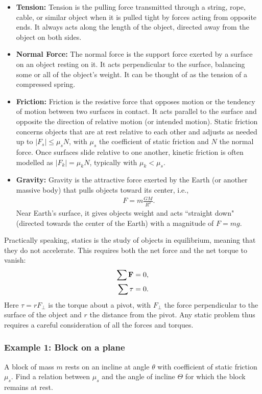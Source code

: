 \documentclass[12pt]{article}
\newcommand{\be}{\begin{eqnarray}}
\newcommand{\ee}{\end{eqnarray}}
\begin{document}
\begin{itemize}
\item {\bf Tension: }Tension is the pulling force transmitted through a string, rope, cable, or similar object when it is pulled tight by forces acting from opposite ends. It always acts along the length of the object, directed away from the object on both sides. 

\item {\bf Normal Force:} The normal force is the support force exerted by a surface on an object resting on it. It acts perpendicular to the surface, balancing some or all of the object's weight. It can be thought of as the tension of a compressed spring.  

\item {\bf Friction:} Friction is the resistive force that opposes motion or the tendency of motion between two surfaces in contact. It acts parallel to the surface and opposite the direction of relative motion (or intended motion). Static friction concerns objects that are at rest relative to each other and adjusts as needed up to $|F_s|\leq \mu_s N$, with $\mu_s$ the coefficient of static friction and $N$ the normal force. Once surfaces slide relative to one another, kinetic friction is often modelled as $|F_k|=\mu_kN$, typically with $\mu_k<\mu_s$.

\item {\bf Gravity: }Gravity is the attractive force exerted by the Earth (or another massive body) that pulls objects toward its center, i.e., 
\be
F = m \frac{GM}{R^2}.
\ee
Near Earth’s surface, it gives objects weight and acts ``straight down" (directed towards the center of the Earth) with a magnitude of 
$F=mg$. 
\end{itemize}

Practically speaking, statics is the study of objects in equilibrium, meaning that they do not accelerate. This requires both the net force and the net torque to vanish:
\be
\sum {\bf F} &= 0, \\
\sum \tau &= 0.
\ee
Here $\tau = rF_\perp$ is the torque about a pivot, with $F_{\perp}$ the force perpendicular to the surface of the object and $r$ the distance from the pivot. Any static problem thus requires a careful consideration of all the forces and torques.  

\subsubsection*{Example 1: Block on a plane}
A block of mass $m$ rests on an incline at angle $\theta$ with coefficient of static friction $\mu_s$. Find a relation between $\mu_s$ and the angle of incline $\Theta$ for which the block remains at rest. 
\end{document}
